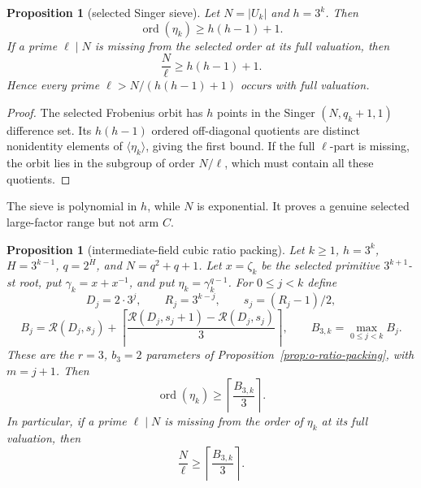 \documentclass[11pt]{article}
\newtheorem{proposition}[theorem]{Proposition}
\theoremstyle{definition}
\theoremstyle{remark}
\begin{document}
\begin{proposition}[selected Singer sieve]\label{prop:sieve}
Let $N=|U_k|$ and $h=3^k$.  Then
\[
  \operatorname{ord}(\eta_k)\geq h(h-1)+1.
\]
If a prime $\ell\mid N$ is missing from the selected order at its full
valuation, then
\[
  \frac N\ell\geq h(h-1)+1.
\]
Hence every prime $\ell>N/(h(h-1)+1)$ occurs with full valuation.
\end{proposition}

\begin{proof}
The selected Frobenius orbit has $h$ points in the Singer
$(N,q_k+1,1)$ difference set.  Its $h(h-1)$ ordered off-diagonal quotients
are distinct nonidentity elements of $\langle\eta_k\rangle$, giving the
first bound.  If the full $\ell$-part is missing, the orbit lies in the
subgroup of order $N/\ell$, which must contain all these quotients.
\end{proof}

The sieve is polynomial in $h$, while $N$ is exponential.  It proves a
genuine selected large-factor range but not arm $C$.

\begin{proposition}[intermediate-field cubic ratio packing]
\label{prop:c-ratio-packing}
Let $k\geq1$, $h=3^k$, $H=3^{k-1}$, $q=2^H$, and
$N=q^2+q+1$.  Let $x=\zeta_k$ be the selected primitive
$3^{k+1}$-st root, put $\gamma_k=x+x^{-1}$, and put
$\eta_k=\gamma_k^{q-1}$.  For $0\leq j<k$ define
\[
 D_j=2\cdot3^j,\qquad R_j=3^{k-j},\qquad s_j=(R_j-1)/2,
\]
\[
 B_j=\mathcal R(D_j,s_j)+
 \left\lceil\frac{\mathcal R(D_j,s_j+1)-\mathcal R(D_j,s_j)}3\right\rceil,
 \qquad B_{3,k}=\max_{0\leq j<k}B_j.
\]
These are the $r=3$, $b_3=2$ parameters of
Proposition~\ref{prop:o-ratio-packing}, with $m=j+1$.  Then
\[
 \operatorname{ord}(\eta_k)\geq
 \left\lceil\frac{B_{3,k}}3\right\rceil.
\]
In particular, if a prime $\ell\mid N$ is missing from the order of
$\eta_k$ at its full valuation, then
\[
 \frac N\ell\geq\left\lceil\frac{B_{3,k}}3\right\rceil.
\]
\end{proposition}
\end{document}
